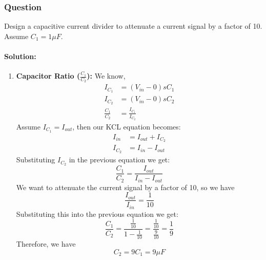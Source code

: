 \subsubsection{Question}
Design a capacitive current divider to attenuate a current signal by
a factor of 10. Assume \(C_1 = 1\mu F\).
\paragraph{Solution:}
\begin{enumerate}
  \item \textbf{Capacitor Ratio (\(\frac{C_1}{C_2}\)):}
    We know,
    \begin{align*}
      I_{C_1} &= (V_{in} - 0)sC_1 \\
      I_{C_2} &= (V_{in} - 0)sC_2 \\
      \frac{C_1}{C_2} &= \frac{I_{C_1}}{I_{C_2}}
    \end{align*}
    Assume \(I_{C_1} = I_{out}\), then our KCL equation becomes:
    \begin{align*}
      I_{in} &= I_{out} + I_{C_2} \\
      I_{C_2} &= I_{in} - I_{out}
    \end{align*}
    Substituting \(I_{C_2}\) in the previous equation
    we get:
    \[
      \frac{C_1}{C_2} = \frac{I_{out}}{I_{in} - I_{out}}
    \]
    We want to attenuate the current signal by a factor of 10, so we have
    \[
      \frac{I_{out}}{I_{in}} = \frac{1}{10}
    \]
    Substituting this into the previous equation we get:
    \[
      \frac{C_1}{C_2} = \frac{\frac{1}{10}}{1 - \frac{1}{10}} = \frac{\frac{1}{10}}{\frac{9}{10}} = \frac{1}{9}
    \]
    Therefore, we have
    \[
      C_2 = 9C_1 = 9 \mu F
    \]
\end{enumerate}

